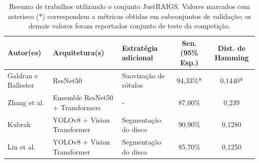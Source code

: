 \documentclass[12pt]{article}
\begin{document}
\begin{table}[h]
    \centering
    \scriptsize
    \renewcommand{\arraystretch}{1.5}
    \begin{tabularx}{\textwidth}{p{2.5cm}p{3cm}lcc}
    \toprule
    \textbf{Autor(es)} & \textbf{Arquitetura(s)} & \textbf{Estratégia adicional} & \textbf{Sen. (95\% Esp.)} & \textbf{Dist. de Hamming} \\
    \midrule
    Galdran e Ballester \cite{justraigs_galdran} & ResNet50 & Suavização de rótulos & 94,33\%* & 0,1440* \\

    Zhang et al. \cite{justraigs_zhang} & Ensemble ResNet50 + Transformers & - & 87,00\% & 0,239 \\

    Kubrak \cite{justraigs_kubrak} & YOLOv8 + Vision Transformer & Segmentação do disco & 90,90\% & 0,1280 \\

    Lin et al. \cite{justraigs_hu_lin} & YOLOv8 + Vision Transformer & Segmentação do disco & 85,70\% & 0,1250 \\
    \bottomrule
    \end{tabularx}
    \renewcommand{\arraystretch}{1}
    \caption{Resumo de trabalhos utilizando o conjunto JustRAIGS. Valores marcados com asterisco (*) correspondem a métricas obtidas em subconjuntos de validação; os demais valores foram reportados conjunto de teste da competição.}
    \label{tab:justraigs_work}
\end{table}










\end{document}
